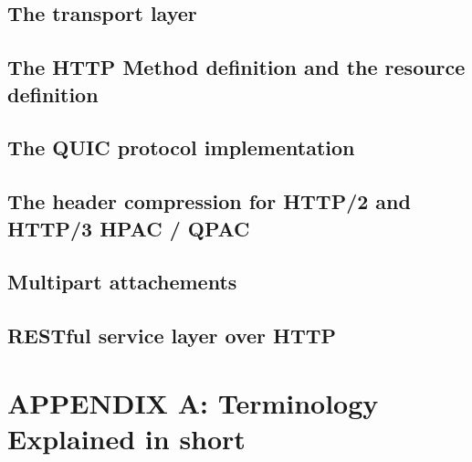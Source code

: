 \documentclass[10pt,a4paper,english]{article}
\begin{document}
\begin{multicols}{2}
\subsection{The transport layer}
\begin{flushleft}
\end{flushleft}
\subsection{The HTTP Method definition and the resource definition}
\begin{flushleft}
\end{flushleft}
\subsection{The QUIC protocol implementation}
\begin{flushleft}
\end{flushleft}
\subsection{The header compression for HTTP/2 and HTTP/3 HPAC / QPAC}
\begin{flushleft}
\end{flushleft}
\subsection{Multipart attachements}
\begin{flushleft}
\end{flushleft}
\subsection{RESTful service layer over HTTP }
\begin{flushleft}
\end{flushleft}

\section{APPENDIX A: Terminology Explained in short}

\end{multicols}
\end{document}
